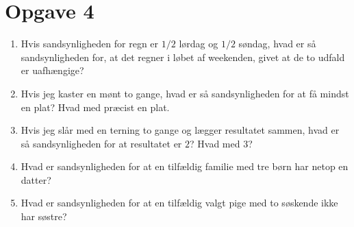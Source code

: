 \section*{Opgave 4}
\begin{enumerate}[label=\roman*)]
\item Hvis sandsynligheden for regn er $1/2$ lørdag og $1/2$ søndag, hvad er så sandsynligheden for, at det regner i løbet af weekenden, givet at de to udfald er uafhængige?
\item Hvis jeg kaster en mønt to gange, hvad er så sandsynligheden for at få mindst en plat? Hvad med præcist en plat.
\item Hvis jeg slår med en terning to gange og lægger resultatet sammen, hvad er så sandsynligheden for at resultatet er $2$? Hvad med $3$?
\item Hvad er sandsynligheden for at en tilfældig familie med tre børn har netop en datter?
\item Hvad er sandsynligheden for at en tilfældig valgt pige med to søskende ikke har søstre?
\end{enumerate}